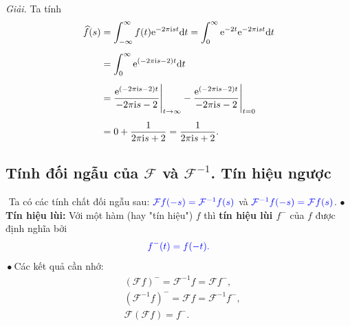 \documentclass[10pt, a4paper]{article}
\begin{document}
	\textit{Giải.} Ta tính \begin{align*}
		\widehat f(s)&=\int_{-\infty}^\infty f(t)\mathrm e^{-2\pi\mathrm ist}\mathrm dt=\int_0^\infty\mathrm e^{-2t}\mathrm e^{-2\pi\mathrm ist}\mathrm dt\\
		\noalign{\vskip5pt}
		&=\int_0^\infty\mathrm e^{(-2\pi\mathrm is-2)t}\mathrm dt\\
		\noalign{\vskip5pt}
		&=\frac{\mathrm e^{(-2\pi\mathrm is-2)t}}{-2\pi\mathrm is-2}\Bigg|_{t\to\infty}-\frac{\mathrm e^{(-2\pi\mathrm is-2)t}}{-2\pi\mathrm is-2}\Bigg|_{t=0}\\
		\noalign{\vskip5pt}
		&=0+\frac{1}{2\pi\mathrm is+2}=\frac{1}{2\pi\mathrm is+2}.
	\end{align*}
	\subsection{Tính đối ngẫu của $\mathcal F$ và $\mathcal F^{-1}$. Tín hiệu ngược}
	\vspace{2mm}
	\quad\,\,Ta có các tính chất đối ngẫu sau: $\color{blue}\mathcal Ff(-s)=\mathcal F^{-1}f(s)$ và $\color{blue}\mathcal F^{-1}f(-s)=\mathcal Ff(s)$.\vskip7pt
	$\bullet~$\textbf{Tín hiệu lùi:} Với một hàm (hay "tín hiệu") $f$ thì \textbf{\color{red}tín hiệu lùi $f^-$} của $f$ được định nghĩa bởi $$\color{blue}f^-(t)=f(-t).$$
	\quad\,$\bullet~$Các kết quả cần nhớ:\begin{align*}
		&(\mathcal Ff)^-=\mathcal F^{-1}f=\mathcal Ff^-,\\
		&\left(\mathcal F^{-1}f\right)^-=\mathcal Ff=\mathcal F^{-1}f^-,\\
		&\mathcal F(\mathcal Ff)=f^-.
	\end{align*}
\end{document}
